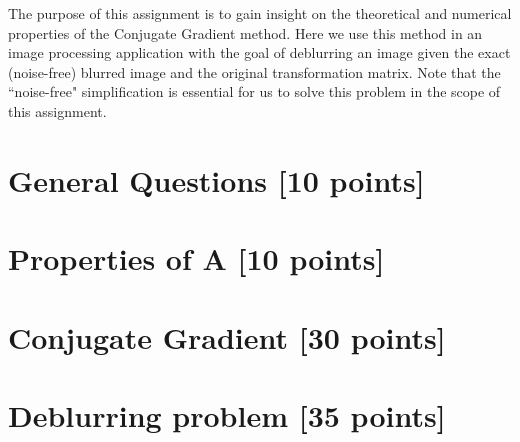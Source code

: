 \documentclass[unicode,11pt,a4paper,oneside,numbers=endperiod,openany]{scrartcl}
\begin{document}
\setassignment
{}

\newline

\assignmentpolicy


The purpose of this assignment is to gain insight on the theoretical and numerical properties of the Conjugate Gradient method. Here we use this method in an image processing application with the goal of deblurring an image given the exact (noise-free) blurred image and the original transformation matrix. Note that the ``noise-free" simplification is essential for us to solve this problem in the scope of this assignment.


\section{General Questions [10 points]}

\section{Properties of A [10 points]}

\section{Conjugate Gradient [30 points]}

\section{Deblurring problem [35 points]}
\end{document}
